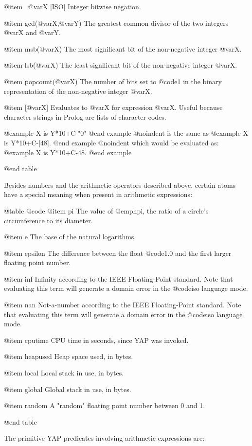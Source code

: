 {{{{@item \ @var{X} [ISO]
Integer bitwise negation.

@item gcd(@var{X},@var{Y})
The greatest common divisor of the two integers @var{X} and @var{Y}.

@item msb(@var{X})
The most significant bit of the non-negative integer @var{X}.

@item lsb(@var{X})
The least significant bit of the non-negative integer @var{X}.

@item popcount(@var{X})
The number of bits set to @code{1} in the binary representation of the
non-negative integer @var{X}.

@item [@var{X}]
Evaluates to @var{X} for expression @var{X}. Useful because character
strings in Prolog are lists of character codes.

@example
X is Y*10+C-"0"
@end example
@noindent
is the same as
@example
X is Y*10+C-[48].
@end example
@noindent
which would be evaluated as:
@example
X is Y*10+C-48.
@end example

@end table

Besides numbers and the arithmetic operators described above, certain
atoms have a special meaning when present in arithmetic expressions:

@table @code
@item pi
The value of @emph{pi}, the ratio of a circle's circumference to its
diameter.

@item e
The base of the natural logarithms.

@item epsilon
The difference between the float @code{1.0} and the first larger floating point
number.

@item inf
Infinity according to the IEEE Floating-Point standard. Note that
evaluating this term will generate a domain error in the @code{iso}
language mode.

@item nan
Not-a-number according to the IEEE Floating-Point standard. Note that
evaluating this term will generate a domain error in the @code{iso}
language mode.

@item cputime
CPU time in seconds, since YAP was invoked.

@item heapused
Heap space used, in bytes.

@item local
Local stack in use, in bytes.

@item global
Global stack in use, in bytes.

@item random
A "random" floating point number between 0 and 1.

@end table

The primitive YAP predicates involving arithmetic expressions are:

}}}}
